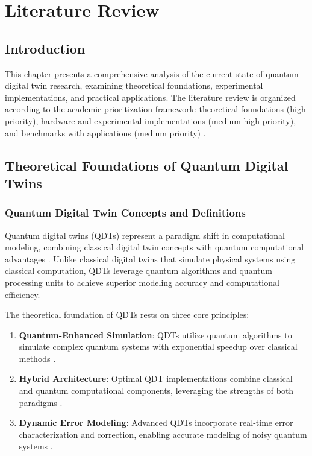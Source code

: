 
\chapter{Literature Review}
\label{ch:literature_review}

\section{Introduction}

This chapter presents a comprehensive analysis of the current state of quantum digital twin research, examining theoretical foundations, experimental implementations, and practical applications. The literature review is organized according to the academic prioritization framework: theoretical foundations (high priority), hardware and experimental implementations (medium-high priority), and benchmarks with applications (medium priority) \cite{amcis2022quantum}.

\section{Theoretical Foundations of Quantum Digital Twins}

\subsection{Quantum Digital Twin Concepts and Definitions}

Quantum digital twins (QDTs) represent a paradigm shift in computational modeling, combining classical digital twin concepts with quantum computational advantages \cite{pagano2024ab}. Unlike classical digital twins that simulate physical systems using classical computation, QDTs leverage quantum algorithms and quantum processing units to achieve superior modeling accuracy and computational efficiency.

The theoretical foundation of QDTs rests on three core principles:

\begin{enumerate}
    \item \textbf{Quantum-Enhanced Simulation}: QDTs utilize quantum algorithms to simulate complex quantum systems with exponential speedup over classical methods \cite{lu2024neural}.
    
    \item \textbf{Hybrid Architecture}: Optimal QDT implementations combine classical and quantum computational components, leveraging the strengths of both paradigms \cite{elsevier2025quantum}.
    
    \item \textbf{Dynamic Error Modeling}: Advanced QDTs incorporate real-time error characterization and correction, enabling accurate modeling of noisy quantum systems \cite{muller2024towards}.
\end{enumerate}

